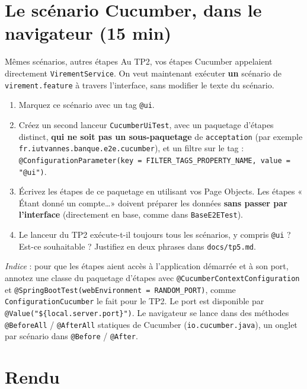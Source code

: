 \documentclass[11pt]{article}
\begin{document}
\section{Le scénario Cucumber, dans le navigateur (15 min)}

\begin{exobox}{Mêmes scénarios, autres étapes}
Au TP2, vos étapes Cucumber appelaient directement \texttt{VirementService}. On veut maintenant exécuter \textbf{un} scénario de \texttt{virement.feature} à travers l'interface, sans modifier le texte du scénario.
\begin{enumerate}[leftmargin=1.4em]
  \item Marquez ce scénario avec un tag \texttt{@ui}.
  \item Créez un second lanceur \texttt{CucumberUiTest}, avec un paquetage d'étapes distinct, \textbf{qui ne soit pas un sous-paquetage} de \texttt{acceptation} (par exemple \texttt{fr.iutvannes.banque.e2e.cucumber}), et un filtre sur le tag :\\
  \texttt{@ConfigurationParameter(key = FILTER\_TAGS\_PROPERTY\_NAME, value = "@ui")}.
  \item Écrivez les étapes de ce paquetage en utilisant vos Page Objects. Les étapes « Étant donné un compte\ldots » doivent préparer les données \textbf{sans passer par l'interface} (directement en base, comme dans \texttt{BaseE2ETest}).
  \item Le lanceur du TP2 exécute-t-il toujours tous les scénarios, y compris \texttt{@ui} ? Est-ce souhaitable ? Justifiez en deux phrases dans \texttt{docs/tp5.md}.
\end{enumerate}
\textit{Indice} : pour que les étapes aient accès à l'application démarrée et à son port, annotez une classe du paquetage d'étapes avec \texttt{@CucumberContextConfiguration} et \texttt{@SpringBootTest(webEnvironment = RANDOM\_PORT)}, comme \texttt{ConfigurationCucumber} le fait pour le TP2. Le port est disponible par \texttt{@Value("\$\{local.server.port\}")}. Le navigateur se lance dans des méthodes \texttt{@BeforeAll} / \texttt{@AfterAll} statiques de Cucumber (\texttt{io.cucumber.java}), un onglet par scénario dans \texttt{@Before} / \texttt{@After}.
\end{exobox}

\section{Rendu}
\end{document}
